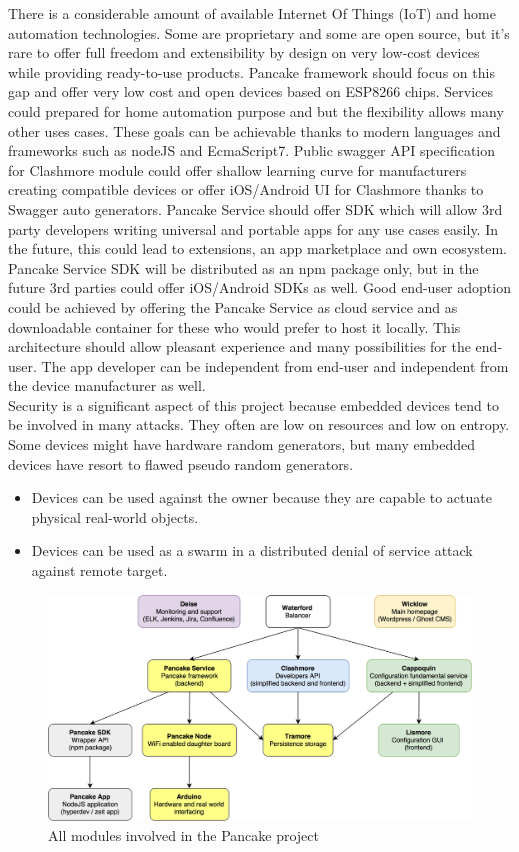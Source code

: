 \documentclass{article}
\begin{document}
\justify
There is a considerable amount of available Internet Of Things (IoT) and home automation technologies. Some are proprietary and some are open source, but it’s rare to offer full freedom and extensibility by design on very low-cost devices while providing ready-to-use products. Pancake framework should focus on this gap and offer very low cost and open devices based on ESP8266 chips. Services could prepared for home automation purpose and but the flexibility allows many other uses cases. These goals can be achievable thanks to modern languages and frameworks such as nodeJS and EcmaScript7. Public swagger API specification for Clashmore module could offer shallow learning curve for manufacturers creating compatible devices or offer  iOS/Android UI for Clashmore thanks to Swagger auto generators. Pancake Service should offer SDK which will allow 3rd party developers writing universal and portable apps for any use cases easily. In the future, this could lead to extensions, an app marketplace and own ecosystem. Pancake Service SDK will be distributed as an npm package only, but in the future 3rd parties could offer iOS/Android SDKs as well. Good end-user adoption could be achieved by offering the Pancake Service as cloud service and as downloadable container for these who would prefer to host it locally. This architecture should allow pleasant experience and many possibilities for the end-user. The app developer can be independent from end-user and independent from the device manufacturer as well.\\

Security is a significant aspect of this project because embedded devices tend to be involved in many attacks. They often are low on resources and low on entropy. Some devices might have hardware random generators, but many embedded devices have resort to flawed pseudo random generators. 
 
\begin{itemize}
  \item Devices can be used against the owner because they are capable to actuate physical  real-world objects. 
  \item Devices can be used as a swarm in a distributed denial of service attack against remote target.
\end{itemize}

\begin{figure}[h!]
	\includegraphics[scale=0.168]{images/modules.png}
    \caption{All modules involved in the Pancake project}
    \label{fig:modules}
\end{figure}
\end{document}

